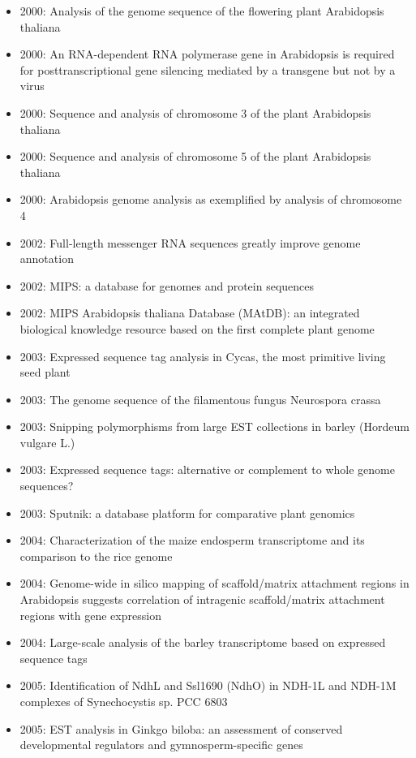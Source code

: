 \begin{itemize}
\item 2000: Analysis of the genome sequence of the flowering plant Arabidopsis thaliana
\item 2000: An RNA-dependent RNA polymerase gene in Arabidopsis is required for posttranscriptional gene silencing mediated by a transgene but not by a virus
\item 2000: Sequence and analysis of chromosome 3 of the plant Arabidopsis thaliana
\item 2000: Sequence and analysis of chromosome 5 of the plant Arabidopsis thaliana
\item 2000: Arabidopsis genome analysis as exemplified by analysis of chromosome 4
\item 2002: Full-length messenger RNA sequences greatly improve genome annotation
\item 2002: MIPS: a database for genomes and protein sequences
\item 2002: MIPS Arabidopsis thaliana Database (MAtDB): an integrated biological knowledge resource based on the first complete plant genome
\item 2003: Expressed sequence tag analysis in Cycas, the most primitive living seed plant
\item 2003: The genome sequence of the filamentous fungus Neurospora crassa
\item 2003: Snipping polymorphisms from large EST collections in barley (Hordeum vulgare L.)
\item 2003: Expressed sequence tags: alternative or complement to whole genome sequences?
\item 2003: Sputnik: a database platform for comparative plant genomics
\item 2004: Characterization of the maize endosperm transcriptome and its comparison to the rice genome
\item 2004: Genome-wide in silico mapping of scaffold/matrix attachment regions in Arabidopsis suggests correlation of intragenic scaffold/matrix attachment regions with gene expression
\item 2004: Large-scale analysis of the barley transcriptome based on expressed sequence tags
\item 2005: Identification of NdhL and Ssl1690 (NdhO) in NDH-1L and NDH-1M complexes of Synechocystis sp. PCC 6803
\item 2005: EST analysis in Ginkgo biloba: an assessment of conserved developmental regulators and gymnosperm-specific genes

\end{itemize}

